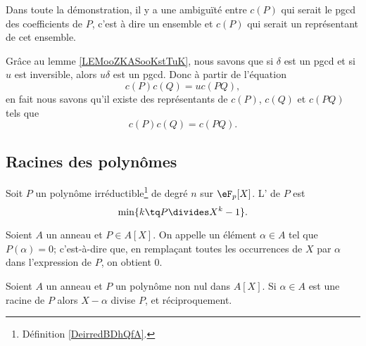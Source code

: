 \begin{normaltext}
	Dans toute la démonstration, il y a une ambiguïté entre \( c(P)\) qui serait le pgcd des coefficients de \( P\), c'est à dire un ensemble et \( c(P)\) qui serait un représentant de cet ensemble.

	Grâce au lemme \ref{LEMooZKASooKstTuK}, nous savons que si \( \delta\) est un pgcd et si \( u\) est inversible, alors \( u\delta\) est un pgcd. Donc à partir de l'équation
	\begin{equation}
		c(P)c(Q)=uc(PQ),
	\end{equation}
	en fait nous savons qu'il existe des représentants de \( c(P)\), \( c(Q) \) et \( c(PQ)\) tels que
	\begin{equation}
		c(P)c(Q)=c(PQ).
	\end{equation}
\end{normaltext}

\subsection{Racines des polynômes}


\begin{definition}
	Soit \( P\) un polynôme irréductible\footnote{Définition \ref{DeirredBDhQfA}.} de degré \( n\) sur \( \eF_p[X]\). L' de \( P\) est
	\begin{equation}
		\min\{ k\tq P\divides X^k-1 \}.
	\end{equation}
\end{definition}


\begin{definition}
	Soient \( A \) un anneau et \( P \in A[X] \). On appelle
	 un élément \( \alpha \in A \)
	tel que \( P(\alpha) = 0 \); c'est-à-dire que, en remplaçant toutes
	les occurrences de \( X\) par \( \alpha\) dans l'expression de \( P\), on
	obtient \( 0\).
\end{definition}

\begin{proposition} \label{PropHSQooASRbeA}
	Soient \( A\) un anneau et \( P\) un polynôme non nul dans \( A[X]\). Si \( \alpha\in A\) est une racine de \( P\) alors \( X-\alpha\) divise \( P\), et réciproquement.
\end{proposition}

